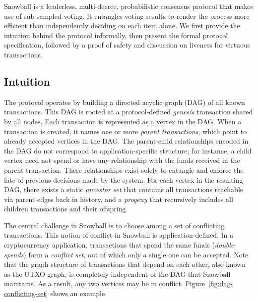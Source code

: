 Snowball is a leaderless, multi-decree, probabilistic consensus protocol that makes
use of sub-sampled voting. It entangles voting results to render the process
more efficient than independently deciding on each item alone. We first provide
the intuition behind the protocol informally, then present the formal protocol
specification, followed by a proof of safety and discussion on liveness for virtuous
transactions.

\subsection{Intuition}

The protocol operates by building a directed acyclic graph (DAG) of all known transactions.
This DAG is rooted at a protocol-defined \emph{genesis} transaction shared by all nodes.
Each transaction is represented as a vertex in the DAG.
When a transaction is created, it names one or more \emph{parent transactions}, which point to already accepted vertices in the DAG.
The parent-child relationships encoded in the DAG do not correspond to application-specific structure; for instance, a child vertex need not spend or have any relationship with the funds received in the parent transaction.
These relationships exist solely to entangle and enforce the fate of previous decisions made by the system.
For each vertex in the resulting DAG, there exists a static \emph{ancestor set} that contains all transactions reachable via parent edges back in history, and a \emph{progeny} that recursively includes all children transactions and their offspring.

The central challenge in Snowball is to choose among a set of conflicting transactions.
This notion of conflict in Snowball is application-defined.
In a cryptocurrency application, transactions that spend the same funds (\emph{double-spends}) form a \emph{conflict set}, out of which only a single one can be accepted.
Note that the graph structure of transactions that depend on each other, also known as the UTXO graph, is completely independent of the DAG that Snowball maintains. As a result, any two vertices may be in conflict.
Figure~\ref{fig:dag-conflicting-set} shows an example.

\begin{center}
    
    \label{fig:dag-conflicting-set}
\end{center}

